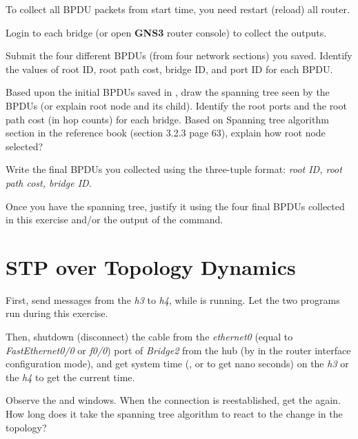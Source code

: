\documentclass{../UTNetLab}
\begin{document}
    To collect all BPDU packets from start time, you need restart (reload) all router.

    Login to each bridge (or open \textbf{GNS3} router console) to collect the  outputs.

    \begin{report}
        \item Submit the four different BPDUs (from four network sections) you saved.
            Identify the values of root ID, root path cost, bridge ID, and port ID for each BPDU.

        \item Based upon the initial BPDUs saved in , draw the spanning tree seen by the BPDUs (or explain root node and its child).
            Identify the root ports and the root path cost (in hop counts) for each bridge.
            Based on Spanning tree algorithm section in the reference book (section 3.2.3 page 63), explain how root node selected?

        \item Write the final BPDUs you collected using the three-tuple format: \textit{{root ID, root path cost, bridge ID}}.

        \item Once you have the spanning tree, justify it using the four final BPDUs collected in this exercise and/or the output of the  command.
    \end{report}


\section{STP over Topology Dynamics}
    First, send  messages from the \textit{h3} to \textit{h4}, while  is running.
    Let the two programs run during this exercise.

    Then, shutdown (disconnect) the cable from the \textit{ethernet0} (equal to \textit{FastEthernet0/0} or \textit{f0/0}) port of \textit{Bridge2} from the hub (by  in the router interface configuration mode), and get system time (,  or  to get nano seconds) on the \textit{h3} or the \textit{h4} to get the current time.

    Observe the  and  windows.
    When the connection is reestablished, get the  again.
    How long does it take the spanning tree algorithm to react to the change in the topology?
\end{document}
